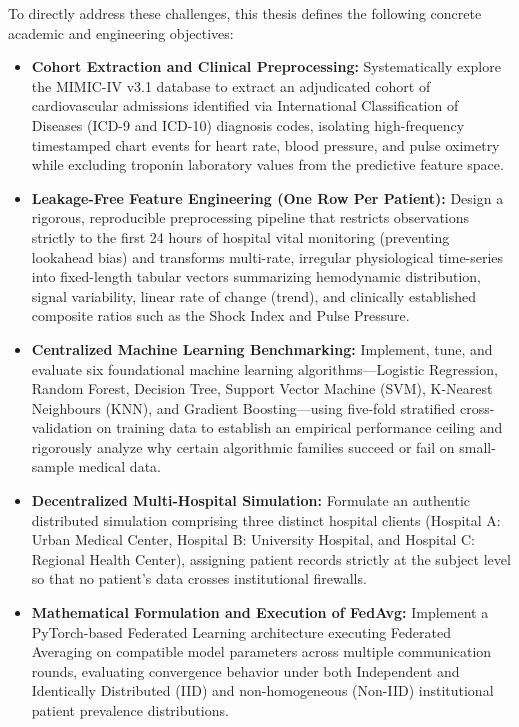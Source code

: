 \documentclass[12pt,a4paper,oneside]{report}
\begin{document}
To directly address these challenges, this thesis defines the following concrete academic and engineering objectives:

\begin{itemize}
    \item \textbf{Cohort Extraction and Clinical Preprocessing:} Systematically explore the MIMIC-IV v3.1 database to extract an adjudicated cohort of cardiovascular admissions identified via International Classification of Diseases (ICD-9 and ICD-10) diagnosis codes, isolating high-frequency timestamped chart events for heart rate, blood pressure, and pulse oximetry while excluding troponin laboratory values from the predictive feature space.
    
    \item \textbf{Leakage-Free Feature Engineering (One Row Per Patient):} Design a rigorous, reproducible preprocessing pipeline that restricts observations strictly to the first 24 hours of hospital vital monitoring (preventing lookahead bias) and transforms multi-rate, irregular physiological time-series into fixed-length tabular vectors summarizing hemodynamic distribution, signal variability, linear rate of change (trend), and clinically established composite ratios such as the Shock Index and Pulse Pressure.
    
    \item \textbf{Centralized Machine Learning Benchmarking:} Implement, tune, and evaluate six foundational machine learning algorithms—Logistic Regression, Random Forest, Decision Tree, Support Vector Machine (SVM), K-Nearest Neighbours (KNN), and Gradient Boosting—using five-fold stratified cross-validation on training data to establish an empirical performance ceiling and rigorously analyze why certain algorithmic families succeed or fail on small-sample medical data.
    
    \item \textbf{Decentralized Multi-Hospital Simulation:} Formulate an authentic distributed simulation comprising three distinct hospital clients (Hospital A: Urban Medical Center, Hospital B: University Hospital, and Hospital C: Regional Health Center), assigning patient records strictly at the subject level so that no patient's data crosses institutional firewalls.
    
    \item \textbf{Mathematical Formulation and Execution of FedAvg:} Implement a PyTorch-based Federated Learning architecture executing Federated Averaging on compatible model parameters across multiple communication rounds, evaluating convergence behavior under both Independent and Identically Distributed (IID) and non-homogeneous (Non-IID) institutional patient prevalence distributions.
    

\end{itemize}
\end{document}

